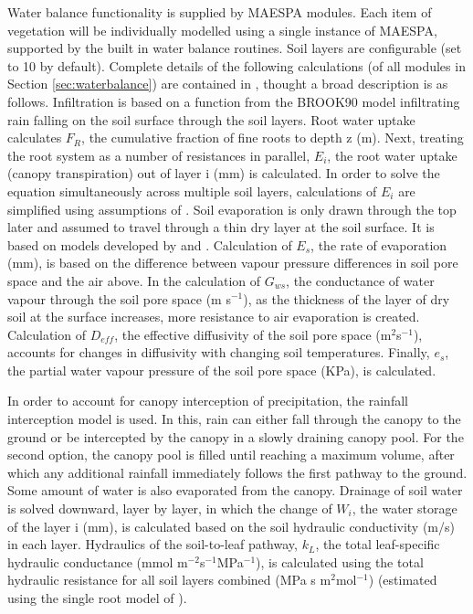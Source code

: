 \documentclass[final,3p,times,authoryear]{elsarticle}
\begin{document}
\label{sec:waterbalance}
Water balance functionality is supplied by MAESPA modules. Each item of vegetation will be individually modelled using a single instance of MAESPA, supported by the built in water balance routines. Soil layers are configurable (set to 10 by default). Complete details of the following calculations (of all modules in Section \ref{sec:waterbalance}) are contained in \cite{Duursma2012}, thought a broad description is as follows. Infiltration is based on a function from the BROOK90 model \citep{Federer2003} infiltrating rain falling on the soil surface through the soil layers. Root water uptake calculates $F_{R}$, the cumulative fraction of fine roots to depth z (m). Next, treating the root system as a number of resistances in parallel, $E_{i}$, the root water uptake (canopy transpiration) out of layer i (mm) is calculated. In order to solve the equation simultaneously across multiple soil layers, calculations of $E_{i}$ are simplified using assumptions of \cite{Taylor1975}. Soil evaporation is only drawn through the top later and assumed to travel through a thin dry layer at the soil surface. It is based on models developed by \cite{Choudhury1988} and \cite{Williams2001}. Calculation of $E_{s}$, the rate of evaporation (mm), is based on the difference between vapour pressure differences in soil pore space and the air above. In the calculation of $G_{ws}$, the conductance of water vapour through the soil pore space (m s$^{-1}$), as the thickness of the layer of dry soil at the surface increases, more resistance to air evaporation is created. Calculation of $D_{eff}$, the effective diffusivity of the soil pore space (m$^{2}$s$^{-1}$), accounts for changes in diffusivity with changing soil temperatures. Finally, $e_{s}$, the partial water vapour pressure of the soil pore space (KPa), is calculated. 

In order to account for canopy interception of precipitation, the \cite{Rutter1975} rainfall interception model is used. In this, rain can either fall through the canopy to the ground or be intercepted by the canopy in a slowly draining canopy pool. For the second option, the canopy pool is filled until reaching a maximum volume, after which any additional rainfall immediately follows the first pathway to the ground. Some amount of water is also evaporated from the canopy. Drainage of soil water is solved downward, layer by layer, in which the change of $W_{i}$, the water storage of the layer i (mm), is calculated based on the soil hydraulic conductivity (m/s) in each layer. Hydraulics of the soil-to-leaf pathway, $k_{L}$, the total leaf-specific hydraulic conductance (mmol m$^{-2}$s$^{-1}$MPa$^{-1}$), is calculated using the total hydraulic resistance for all soil layers combined (MPa s m$^{2}$mol$^{-1}$) (estimated using the single root model of \cite{Gardner1960}).
\end{document}
